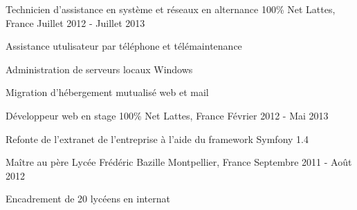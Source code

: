 \begin{cventries}
  \cventry
    {Technicien d'assistance en système et réseaux en alternance} %
    {100\% Net} %
    {Lattes, France} %
    {Juillet 2012 - Juillet 2013} %
    {
      \begin{cvitems} %
        \item {Assistance utulisateur par téléphone et télémaintenance}
        \item {Administration de serveurs locaux Windows}
        \item {Migration d'hébergement mutualisé web et mail}
      \end{cvitems}
    }

\cventry
{Développeur web en stage} %
{100\% Net} %
{Lattes, France} %
{Février 2012 - Mai 2013} %
{
  \begin{cvitems} %
    \item {Refonte de l'extranet de l'entreprise à l'aide du framework Symfony 1.4}
  \end{cvitems}
}

\cventry
{Maître au père} %
{Lycée Frédéric Bazille} %
{Montpellier, France} %
{Septembre 2011 - Août 2012} %
{
  \begin{cvitems} %
    \item {Encadrement de 20 lycéens en internat}
  \end{cvitems}
}

\end{cventries}
